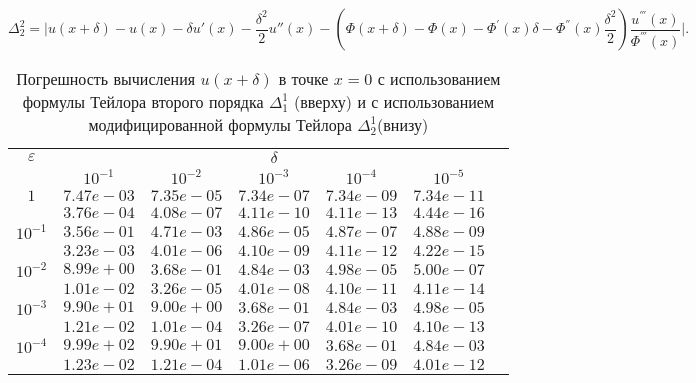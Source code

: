 \documentclass[10pt,twoside]{uz_kgu}
\begin{document}
	$$ \Delta_2^2 = \Big|u(x + \delta) - u(x)-\delta u'(x)  -\frac{\delta^2}{2}u''(x) - (\Phi(x+\delta) - \Phi(x) -  \Phi^{'}(x)\delta - \Phi^{''}(x)\frac{\delta^2}{2}  )\frac{u^{'''}(x)}{\Phi^{'''}(x)} \Big|.$$
	\begin{table} [!htb]
		\caption {Погрешность вычисления $u(x+ \delta)$ в точке $x=0$ с использованием формулы Тейлора второго порядка $\Delta_1^1$ (вверху) и с использованием модифицированной формулы Тейлора $\Delta_2^1$(внизу)}
        \begin{center}
	\begin{tabular}{|c|c|c|c|c|c|c}
		\cline{1-6} $\varepsilon$ & \multicolumn{5}{c|}{$\delta$} \\
		\cline{2-6} &$10^{-1}$ & $10^{-2}$ & $10^{-3}$  & $10^{-4}$& $10^{-5}$\\
		\cline{1-6}
		$1$
		&$7.47e-03$&$7.35e-05$&$7.34e-07$&$7.34e-09$& $7.34e-11$\\
		&$3.76e-04$&$4.08e-07$&$4.11e-10$&$4.11e-13$& $4.44e-16$\\
		\cline{1-6}
		$10^{-1}$
		&$3.56e-01$&$4.71e-03$&$4.86e-05$&$4.87e-07$&$4.88e-09$\\
		&$3.23e-03$&$4.01e-06$&$4.10e-09$&$4.11e-12$&$4.22e-15$\\
		\cline{1-6}
		$10^{-2}$
		&$8.99e+00$&$3.68e-01$&$4.84e-03$&$4.98e-05$&$5.00e-07$\\
		&$1.01e-02$&$3.26e-05$&$4.01e-08$&$4.10e-11$&$4.11e-14$\\
		\cline{1-6}
		$10^{-3}$
		&$9.90e+01$&$9.00e+00$&$3.68e-01$&$4.84e-03$&$4.98e-05$\\
		&$1.21e-02$&$1.01e-04$&$3.26e-07$&$4.01e-10$&$4.10e-13$\\
		\cline{1-6}
		$10^{-4}$
		&$9.99e+02$&$9.90e+01$&$9.00e+00$&$3.68e-01$&$4.84e-03$\\
		&$1.23e-02$&$1.21e-04$&$1.01e-06$&$3.26e-09$&$4.01e-12$\\
		\cline{1-6}
	\end{tabular}
\end{center}
\end{table}
	
	
	
	
\end{document}
